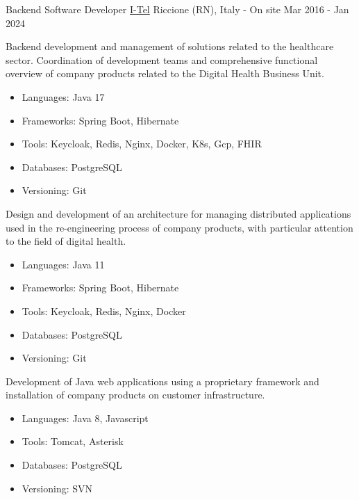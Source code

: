 \begin{cventries}
  \cventry
    {Backend Software Developer} %
    {\href{https://i-tel.it}{I-Tel}} %
    {Riccione (RN), Italy - On site} %
    {Mar 2016 - Jan 2024} %
    {
        Backend development and management of solutions related to the healthcare sector.
        Coordination of development teams and comprehensive functional overview of company products related to the Digital Health Business Unit.
        \begin{itemize}
      		\item {Languages: Java 17}
      		\item {Frameworks: Spring Boot, Hibernate}
            \item {Tools: Keycloak, Redis, Nginx, Docker, K8s, Gcp, FHIR}
      		\item {Databases: PostgreSQL}
      		\item {Versioning: Git}
      	\end{itemize}
        Design and development of an architecture for managing distributed applications used in the re-engineering process of company products, with particular attention to the field of digital health.
        \begin{itemize}
      		\item {Languages: Java 11}
      		\item {Frameworks: Spring Boot, Hibernate}
            \item {Tools: Keycloak, Redis, Nginx, Docker}
      		\item {Databases: PostgreSQL}
      		\item {Versioning: Git}
      	\end{itemize}
        Development of Java web applications using a proprietary framework and installation of company products on customer infrastructure.
      	\begin{itemize}
      		\item {Languages: Java 8, Javascript}
            \item {Tools: Tomcat, Asterisk}
      		\item {Databases: PostgreSQL}
      		\item {Versioning: SVN}
      	\end{itemize}
    }



\end{cventries}
